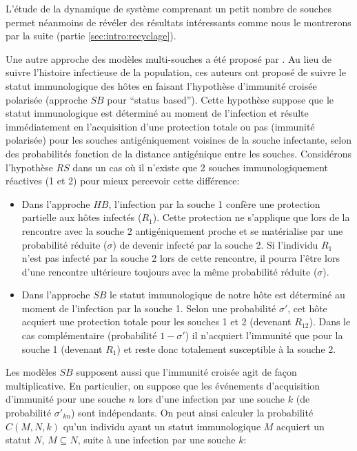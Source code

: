 L'étude de la dynamique de système comprenant un petit nombre de
souches permet néanmoins de révéler des résultats intéressants comme
nous le montrerons par la suite (partie \ref{sec:intro:recyclage}).

Une autre approche des modèles multi-souches a été proposé par
\citet{Gog2002a}. Au lieu de suivre l'histoire infectieuse de la
population, ces auteurs ont proposé de suivre le statut immunologique
des hôtes en faisant l'hypothèse d'immunité croisée polarisée
(approche $SB$ pour ``status based''). Cette hypothèse suppose que le
statut immunologique est déterminé au moment de l'infection et résulte
immédiatement en l'acquisition d'une protection totale ou pas
(immunité polarisée) pour les souches antigéniquement voisines de la
souche infectante, selon des probabilités fonction de la distance
antigénique entre les souches. Considérons l'hypothèse $RS$ dans un
cas où il n'existe que 2 souches immunologiquement réactives (1 et 2)
pour mieux percevoir cette différence:
\begin{itemize}
\item Dans l'approche $HB$, l'infection par la souche 1 confère
  une protection partielle aux hôtes infectés ($R_1$). Cette
  protection ne s'applique que lors de la rencontre avec la souche
  2 antigéniquement proche et se matérialise par une probabilité
  réduite ($\sigma$) de devenir infecté par la souche 2. Si
  l'individu $R_1$ n'est pas infecté par la souche 2 lors de cette
  rencontre, il pourra l'être lors d'une rencontre ultérieure toujours
  avec la même probabilité réduite ($\sigma$).
\item Dans l'approche $SB$ le statut immunologique de notre hôte est
  déterminé au moment de l'infection par la souche 1. Selon une
  probabilité $\sigma'$, cet hôte acquiert une protection totale pour
  les souches 1 et 2 (devenant $R_{12}$).  Dans le cas
  complémentaire (probabilité $1-\sigma'$) il n'acquiert l'immunité
  que pour la souche 1 (devenant $R_1$) et reste donc totalement
  susceptible à la souche 2.
\end{itemize}

Les modèles $SB$ supposent aussi que l'immunité croisée agit de façon
multiplicative. En particulier, on suppose que les événements
d'acquisition d'immunité pour une souche $n$ lors d'une infection par
une souche $k$ (de probabilité $\sigma'_{kn}$) sont indépendants. On
peut ainsi calculer la probabilité $C(M,N,k)$ qu'un individu ayant un
statut immunologique $M$ acquiert un statut $N$, $M \subseteq N$,
suite à une infection par une souche $k$:

